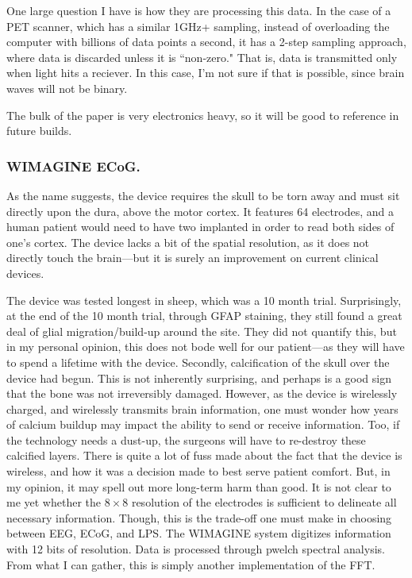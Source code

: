 \documentclass[12pt]{report}
\begin{document}
One large question I have is how they are processing this data. In the case of a PET scanner, which has a similar 1GHz+ sampling, instead of overloading the computer with billions of data points a second, it has a 2-step sampling approach, where data is discarded unless it is ``non-zero." That is, data is transmitted only when light hits a reciever. In this case, I'm not sure if that is possible, since brain waves will not be binary.\newline

The bulk of the paper is very electronics heavy, so it will be good to reference in future builds. 





\subsubsection{WIMAGINE ECoG.}
As the name suggests, the device requires the skull to be torn away and must sit directly upon the dura, above the motor cortex. It features 64 electrodes, and a human patient would need to have two implanted in order to read both sides of one's cortex. The device lacks a bit of the spatial resolution, as it does not directly touch the brain---but it is surely an improvement on current clinical devices.\newline

The device was tested longest in sheep, which was a 10 month trial. Surprisingly, at the end of the 10 month trial, through GFAP staining, they still found a great deal of glial migration/build-up around the site. They did not quantify this, but in my personal opinion, this does not bode well for our patient---as they will have to spend a lifetime with the device. Secondly, calcification of the skull over the device had begun. This is not inherently surprising, and perhaps is a good sign that the bone was not irreversibly damaged. However, as the device is wirelessly charged, and wirelessly transmits brain information, one must wonder how years of calcium buildup may impact the ability to send or receive information. Too, if the technology needs a dust-up, the surgeons will have to re-destroy these calcified layers. There is quite a lot of fuss made about the fact that the device is wireless, and how it was a decision made to best serve patient comfort. But, in my opinion, it may spell out more long-term harm than good. It is not clear to me yet whether the $8\times 8$ resolution of the electrodes is sufficient to delineate all necessary information. Though, this is the trade-off one must make in choosing between EEG, ECoG, and LPS. The WIMAGINE system digitizes information with 12 bits of resolution. Data is processed through pwelch spectral analysis. From what I can gather, this is simply another implementation of the FFT. 
\end{document}
